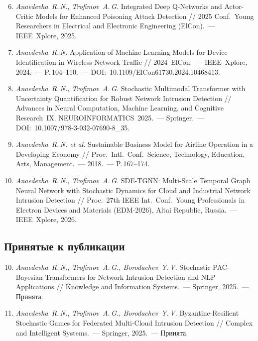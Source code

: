 \documentclass[12pt,a5paper]{article}
\begin{document}
\begin{enumerate}
\setcounter{enumi}{5}
\item \textit{Anaedevha~R.\,N., Trofimov~A.\,G.} Integrated
Deep Q-Networks and Actor-Critic Models for Enhanced
Poisoning Attack Detection // 2025 Conf.\ Young Researchers
in Electrical and Electronic Engineering (ElCon).~---
IEEE~Xplore, 2025.

\item \textit{Anaedevha~R.\,N.} Application of Machine
Learning Models for Device Identification in Wireless
Network Traffic // 2024~ElCon.~--- IEEE~Xplore, 2024.~---
P.\,104--110.~--- DOI:~10.1109/ElCon61730.2024.10468413.

\item \textit{Anaedevha~R.\,N., Trofimov~A.\,G.} Stochastic
Multimodal Transformer with Uncertainty Quantification for
Robust Network Intrusion Detection // Advances in Neural
Computation, Machine Learning, and Cognitive Research~IX.
NEUROINFORMATICS~2025.~--- Springer.~---
DOI:~10.1007/978-3-032-07690-8\_35.

\item \textit{Anaedevha~R.\,N. et al.} Sustainable Business
Model for Airline Operation in a Developing Economy //
Proc.\ Intl.\ Conf.\ Science, Technology, Education, Arts,
Management.~--- 2018.~--- P.\,167--174.

\item \textit{Anaedevha~R.\,N., Trofimov~A.\,G.}
SDE-TGNN: Multi-Scale Temporal Graph Neural Network with
Stochastic Dynamics for Cloud and Industrial Network
Intrusion Detection // Proc.\ 27th IEEE Int.\ Conf.\ Young
Professionals in Electron Devices and Materials
(EDM-2026), Altai Republic, Russia.~--- IEEE~Xplore, 2026.
\end{enumerate}

\subsection*{Принятые к публикации}

\begin{enumerate}
\setcounter{enumi}{9}
\item \textit{Anaedevha~R.\,N., Trofimov~A.\,G., Borodachev~Y.\,V.}
Stochastic PAC-Bayesian Transformers for Network Intrusion
Detection and NLP Applications // Knowledge and
Information Systems.~--- Springer, 2025.~--- Принята.

\item \textit{Anaedevha~R.\,N., Trofimov~A.\,G., Borodachev~Y.\,V.}
Byzantine-Resilient Stochastic Games for Federated
Multi-Cloud Intrusion Detection // Complex and Intelligent
Systems.~--- Springer, 2025.~--- Принята.
\end{enumerate}
\end{document}
